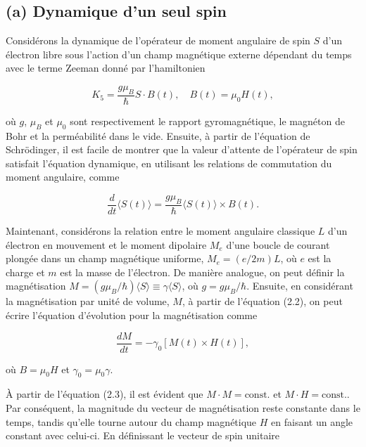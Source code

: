 \documentclass{article}
\begin{document}
	\subsection*{(a) Dynamique d'un seul spin}
	Considérons la dynamique de l'opérateur de moment angulaire de spin $S$ d'un électron libre sous l'action d'un champ magnétique externe dépendant du temps avec le terme Zeeman donné par l'hamiltonien
	
	\begin{equation}
	K_5 = \frac{g\mu_B}{\hbar} S \cdot B(t), \quad B(t) = \mu_0 H(t),
	\end{equation}
	
	où $g$, $\mu_B$ et $\mu_0$ sont respectivement le rapport gyromagnétique, le magnéton de Bohr et la perméabilité dans le vide. Ensuite, à partir de l'équation de Schrödinger, il est facile de montrer que la valeur d'attente de l'opérateur de spin satisfait l'équation dynamique, en utilisant les relations de commutation du moment angulaire, comme
	
	\begin{equation}
	\frac{d}{dt} \langle S(t) \rangle = \frac{g\mu_B}{\hbar} \langle S(t) \rangle \times B(t).
	\end{equation}
	
	Maintenant, considérons la relation entre le moment angulaire classique $L$ d'un électron en mouvement et le moment dipolaire $M_e$ d'une boucle de courant plongée dans un champ magnétique uniforme, $M_e = (e/2m) L$, où $e$ est la charge et $m$ est la masse de l'électron. De manière analogue, on peut définir la magnétisation $M = (g\mu_B/\hbar)\langle S \rangle \equiv \gamma \langle S \rangle$, où $g = g\mu_B/\hbar$. Ensuite, en considérant la magnétisation par unité de volume, $M$, à partir de l'équation (2.2), on peut écrire l'équation d'évolution pour la magnétisation comme
	
	\begin{equation}
	\frac{dM}{dt} = -\gamma_0 [M(t) \times H(t)],
	\end{equation}
	
	où $B = \mu_0 H$ et $\gamma_0 = \mu_0 \gamma$.
	
	À partir de l'équation (2.3), il est évident que $M \cdot M = \text{const.}$ et $M \cdot H = \text{const.}$. Par conséquent, la magnitude du vecteur de magnétisation reste constante dans le temps, tandis qu'elle tourne autour du champ magnétique $H$ en faisant un angle constant avec celui-ci. En définissant le vecteur de spin unitaire
	
\end{document}
